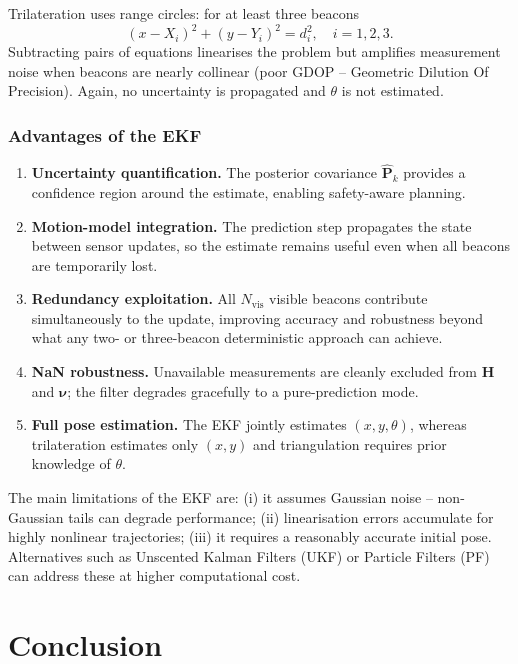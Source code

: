 \documentclass[a4paper,11pt]{report}
\begin{document}
Trilateration uses range circles: for at least three beacons
\begin{equation}
  (x - X_i)^2 + (y - Y_i)^2 = d_i^2, \quad i = 1, 2, 3.
\end{equation}
Subtracting pairs of equations linearises the problem but amplifies measurement noise when beacons are nearly collinear (poor GDOP -- Geometric Dilution Of Precision).  Again, no uncertainty is propagated and $\theta$ is not estimated.

\subsection{Advantages of the EKF}

\begin{enumerate}
  \item \textbf{Uncertainty quantification.}  The posterior covariance $\hat{\mathbf{P}}_k$ provides a confidence region around the estimate, enabling safety-aware planning.
  \item \textbf{Motion-model integration.}  The prediction step propagates the state between sensor updates, so the estimate remains useful even when all beacons are temporarily lost.
  \item \textbf{Redundancy exploitation.}  All $N_{\mathrm{vis}}$ visible beacons contribute simultaneously to the update, improving accuracy and robustness beyond what any two- or three-beacon deterministic approach can achieve.
  \item \textbf{NaN robustness.}  Unavailable measurements are cleanly excluded from $\mathbf{H}$ and $\bm{\nu}$; the filter degrades gracefully to a pure-prediction mode.
  \item \textbf{Full pose estimation.}  The EKF jointly estimates $(x, y, \theta)$, whereas trilateration estimates only $(x, y)$ and triangulation requires prior knowledge of $\theta$.
\end{enumerate}

The main limitations of the EKF are: (i) it assumes Gaussian noise -- non-Gaussian tails can degrade performance; (ii) linearisation errors accumulate for highly nonlinear trajectories; (iii) it requires a reasonably accurate initial pose.  Alternatives such as Unscented Kalman Filters (UKF) or Particle Filters (PF) can address these at higher computational cost.

\chapter{Conclusion}
\label{chap:conclusion}
\end{document}
